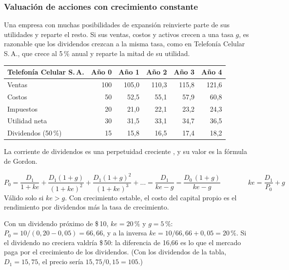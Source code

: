 \subsubsection{Valuación de acciones con crecimiento constante}

Una empresa con muchas posibilidades de expansión reinvierte parte de sus utilidades y reparte el resto. Si sus ventas, costos y activos crecen a una tasa $g$, es razonable que los dividendos crezcan a la misma tasa, como en Telefonía Celular S.\,A., que crece al 5\,\% anual y reparte la mitad de su utilidad.

\begin{center}
\small
\begin{tabular}{@{}lrrrrr@{}}
\toprule
Telefonía Celular S.\,A. & Año 0 & Año 1 & Año 2 & Año 3 & Año 4\\
\midrule
Ventas & 100 & 105,0 & 110,3 & 115,8 & 121,6\\
Costos & 50 & 52,5 & 55,1 & 57,9 & 60,8\\
Impuestos & 20 & 21,0 & 22,1 & 23,2 & 24,3\\
Utilidad neta & 30 & 31,5 & 33,1 & 34,7 & 36,5\\
Dividendos (50\,\%) & 15 & 15,8 & 16,5 & 17,4 & 18,2\\
\bottomrule
\end{tabular}
\end{center}

La corriente de dividendos es una perpetuidad creciente , y su valor es la fórmula de Gordon.

\begin{formulaBox}
\[
P_0 = \frac{D_1}{1+ke} + \frac{D_1(1+g)}{(1+ke)^{2}} + \frac{D_1(1+g)^{2}}{(1+ke)^{3}} + \dots
    = \frac{D_1}{ke-g} = \frac{D_0\,(1+g)}{ke-g}
\qquad\qquad
ke = \frac{D_1}{P_0} + g
\]
Válido solo si $ke > g$. Con crecimiento estable, el costo del capital propio es el rendimiento por dividendos más la tasa de crecimiento.
\end{formulaBox}

\begin{ejemplo}
Con un dividendo próximo de \$\,10, $ke = 20\,\%$ y $g = 5\,\%$: $P_0 = 10/(0{,}20-0{,}05) = 66{,}66$, y a la inversa $ke = 10/66{,}66 + 0{,}05 = 20\,\%$. Si el dividendo no creciera valdría \$\,50: la diferencia de 16,66 es lo que el mercado paga por el crecimiento de los dividendos. (Con los dividendos de la tabla, $D_1 = 15{,}75$, el precio sería $15{,}75/0{,}15 = 105$.)
\end{ejemplo}

